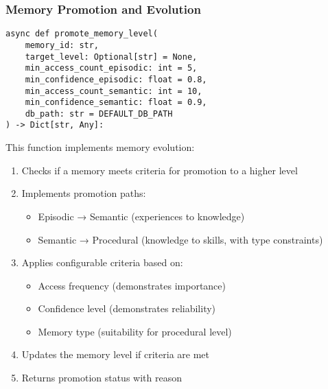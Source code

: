 \documentclass[12pt,a4paper]{article}
\begin{document}
\subsubsection*{Memory Promotion and Evolution}
\begin{pageablecode}
\begin{verbatim}
async def promote_memory_level(
    memory_id: str,
    target_level: Optional[str] = None,
    min_access_count_episodic: int = 5,
    min_confidence_episodic: float = 0.8,
    min_access_count_semantic: int = 10,
    min_confidence_semantic: float = 0.9,
    db_path: str = DEFAULT_DB_PATH
) -> Dict[str, Any]:
\end{verbatim}
\end{pageablecode}
This function implements memory evolution:
\begin{enumerate}[label=\arabic*.]
    \item Checks if a memory meets criteria for promotion to a higher level
    \item Implements promotion paths:
    \begin{itemize}
        \item Episodic → Semantic (experiences to knowledge)
        \item Semantic → Procedural (knowledge to skills, with type constraints)
    \end{itemize}
    \item Applies configurable criteria based on:
    \begin{itemize}
        \item Access frequency (demonstrates importance)
        \item Confidence level (demonstrates reliability)
        \item Memory type (suitability for procedural level)
    \end{itemize}
    \item Updates the memory level if criteria are met
    \item Returns promotion status with reason
\end{enumerate}
\end{document}
